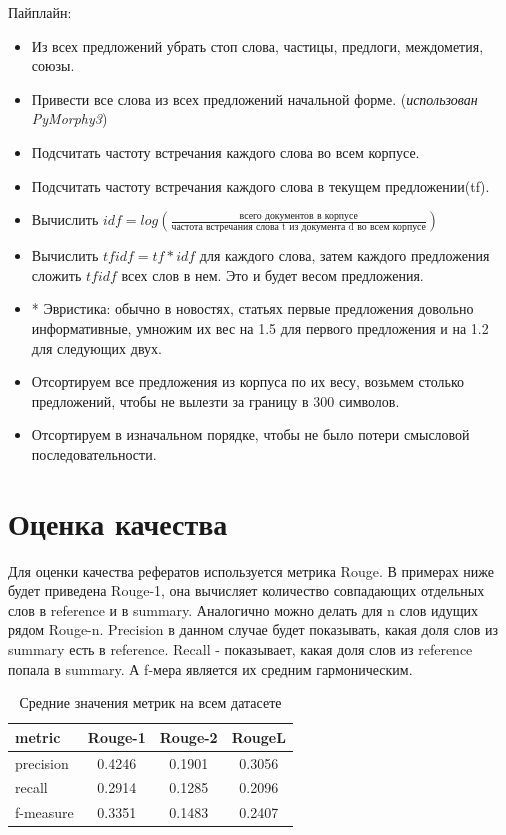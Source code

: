 \documentclass[a4paper]{article}
\begin{document}
Пайплайн:
    \begin{itemize}
        \item Из всех предложений убрать стоп слова, частицы, предлоги, междометия, союзы.
        \item Привести все слова из всех предложений начальной форме. (\emph{использован PyMorphy3})
        \item Подсчитать частоту встречания каждого слова во всем корпусе.
        \item Подсчитать частоту встречания каждого слова в текущем предложении(tf).
        \item Вычислить $idf = log(\frac{\text{всего документов в корпусе}}{\text{частота встречания слова t из документа d во всем корпусе}})$
        \item Вычислить $tfidf = tf * idf$ для каждого слова, затем каждого предложения сложить $tfidf$ всех слов в нем. Это и будет весом предложения.
        \item * Эвристика: обычно в новостях, статьях первые предложения довольно информативные, умножим их вес на 1.5 для первого предложения и на 1.2 для следующих двух.
        \item Отсортируем все предложения из корпуса по их весу, возьмем столько предложений, чтобы не вылезти за границу в 300 символов.
        \item Отсортируем в изначальном порядке, чтобы не было потери смысловой последовательности.
    \end{itemize}
\section{Оценка качества}
    Для оценки качества рефератов используется метрика Rouge. В примерах ниже будет приведена Rouge-1, она вычисляет количество совпадающих отдельных слов в reference и в summary.
    Аналогично можно делать для n слов идущих рядом Rouge-n. Precision в данном случае будет показывать, какая доля слов из summary есть в reference. Recall - показывает, какая доля слов из reference попала в summary.
    А f-мера является их средним гармоническим.

    \begin{table}[ht]
    \caption{Средние значения метрик на всем датасете}
    \centering
        \begin{tabular}{l||c|c|c} 
            \toprule
            metric & Rouge-1 & Rouge-2 & RougeL \\
            \midrule
            precision & 0.4246 & 0.1901 & 0.3056 \\ 
            \midrule
            recall & 0.2914 & 0.1285 & 0.2096 \\
            \midrule
            f-measure & 0.3351 & 0.1483 & 0.2407\\ 
            \bottomrule
        \end{tabular}
    \end{table}
    
\end{document}
